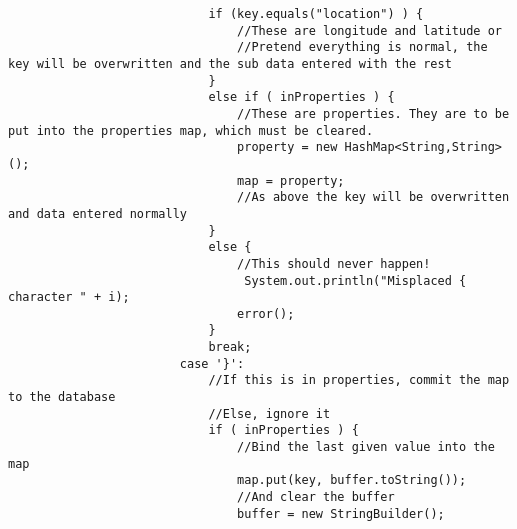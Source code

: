 \begin{lstlisting}
                            if (key.equals("location") ) {
                                //These are longitude and latitude or 
                                //Pretend everything is normal, the key will be overwritten and the sub data entered with the rest
                            }
                            else if ( inProperties ) {
                                //These are properties. They are to be put into the properties map, which must be cleared.
                                property = new HashMap<String,String>();
                                map = property;
                                //As above the key will be overwritten and data entered normally
                            }
                            else {
                                //This should never happen!
                                 System.out.println("Misplaced { character " + i);
                                error();
                            }
                            break;
                        case '}':
                            //If this is in properties, commit the map to the database
                            //Else, ignore it
                            if ( inProperties ) {
                                //Bind the last given value into the map
                                map.put(key, buffer.toString());
                                //And clear the buffer
                                buffer = new StringBuilder();
					    

\end{lstlisting}
